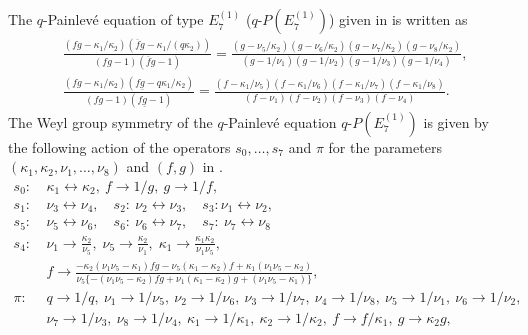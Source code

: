 \documentclass[12pt]{amsart}
\numberwithin{equation}{section}
\theoremstyle{definition}
\begin{document}
\subsection{}
The $q$-Painlev\'e equation of type $E^{(1)}_{7} $ ($q$-$P(E^{(1)}_{7})$) given in \cite{KNY} is written as
\begin{align}
& \frac{(fg- \kappa_{1}/\kappa_{2} ) (\overline{f}g- \kappa_{1}/(q\kappa_{2}) )}{(fg-1)(\overline{f}g-1)}=\frac{(g- \nu_{5}/\kappa_{2} ) (g- \nu_{6}/\kappa_{2} ) (g- \nu_{7}/\kappa_{2} ) (g- \nu_{8}/\kappa_{2} )}{ (g - 1/\nu_{1} )(g - 1/\nu_{2} )(g - 1/\nu_{3} )(g - 1/\nu_{4} )}, \label{eq:qPE17} \\
& \frac{(fg-\kappa_{1}/\kappa_{2} ) (f\underline{g}- q\kappa_{1}/\kappa_{2} )}{(fg-1)(f\underline{g}-1)}=\frac{(f- \kappa_{1}/\nu_{5})(f- \kappa_{1}/\nu_{6})(f- \kappa_{1}/\nu_{7})(f- \kappa_{1}/\nu_{8})}{(f-\nu_{1})(f-\nu_{2})(f-\nu_{3})(f-\nu_{4})}  . \nonumber 
\end{align}
The Weyl group symmetry of the $q$-Painlev\'e equation $q$-$P(E^{(1)}_7 )$ is given by the following action of the operators $s_0, \dots ,s_7$ and $\pi $ for the parameters $(\kappa_{1}, \kappa_{2}, \nu_{1}, \dots , \nu_{8}) $ and $(f, g) $ in \cite{KNY}.
\begin{align}
 s_0 : & \: \kappa_1 \leftrightarrow \kappa_2 ,  \: f \rightarrow 1/g , \: g \rightarrow 1/f ,\label{eq:AffineWeylActionE7} \\
  s_1 : & \: \nu_3 \leftrightarrow \nu_4 , \quad   s_2 : \: \nu_2 \leftrightarrow \nu_3 , \quad  s_3 : \nu_1 \leftrightarrow \nu_2 ,\nonumber \\
  s_5 : & \: \nu_5 \leftrightarrow \nu_6 , \quad   s_6 : \: \nu_6 \leftrightarrow \nu_7 , \quad   s_7 : \: \nu_7 \leftrightarrow \nu_8 \nonumber \\
  s_4 : & \: \nu_1 \rightarrow\frac{\kappa_2}{\nu_5}, \;
  \nu_5 \rightarrow \frac{\kappa_2}{\nu_1}, \;
  \kappa_1 \rightarrow \frac{\kappa_1\kappa_2}{\nu_1\nu_5}, \nonumber \\
& \:    f \rightarrow \frac{- \kappa_2 ( \nu_1 \nu_5 - \kappa_1 )f g - \nu_5 ( \kappa_1 - \kappa_2 )f + \kappa_1 ( \nu_1 \nu_5 - \kappa_2 )}{\nu _5 \{ - ( \nu_1 \nu_5 - \kappa_2 )f g + \nu_1 ( \kappa_1 - \kappa_2 )g + ( \nu_1 \nu_5 - \kappa_1 ) \}} , \nonumber \\
  \pi  : & \: q \rightarrow 1/q, \: \nu_1 \rightarrow 1/\nu_5, \:  \nu_2 \rightarrow 1/\nu_6,  \: \nu_3 \rightarrow 1/\nu_7,  \: \nu_4 \rightarrow 1/\nu_8, \: \nu_5 \rightarrow 1/\nu_1, \: \nu_6 \rightarrow 1/\nu_2, \nonumber \\
& \: \nu_7 \rightarrow 1/\nu_3, \: \nu_8 \rightarrow 1/\nu_4, \: \kappa_1 \rightarrow 1/\kappa_1 , \: \kappa_2 \rightarrow 1/\kappa_2 , \: f \rightarrow f/\kappa_1  , \: g \rightarrow \kappa_2 g , \nonumber 
\end{align}
\end{document}

